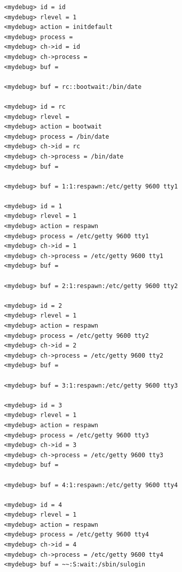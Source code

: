{\begin{shaded}
\begin{verbatim}
<mydebug> id = id
<mydebug> rlevel = 1
<mydebug> action = initdefault
<mydebug> process = 
<mydebug> ch->id = id
<mydebug> ch->process = 
<mydebug> buf = 

<mydebug> buf = rc::bootwait:/bin/date

<mydebug> id = rc
<mydebug> rlevel = 
<mydebug> action = bootwait
<mydebug> process = /bin/date
<mydebug> ch->id = rc
<mydebug> ch->process = /bin/date
<mydebug> buf = 

<mydebug> buf = 1:1:respawn:/etc/getty 9600 tty1

<mydebug> id = 1
<mydebug> rlevel = 1
<mydebug> action = respawn
<mydebug> process = /etc/getty 9600 tty1
<mydebug> ch->id = 1
<mydebug> ch->process = /etc/getty 9600 tty1
<mydebug> buf = 

<mydebug> buf = 2:1:respawn:/etc/getty 9600 tty2

<mydebug> id = 2
<mydebug> rlevel = 1
<mydebug> action = respawn
<mydebug> process = /etc/getty 9600 tty2
<mydebug> ch->id = 2
<mydebug> ch->process = /etc/getty 9600 tty2
<mydebug> buf = 

<mydebug> buf = 3:1:respawn:/etc/getty 9600 tty3

<mydebug> id = 3
<mydebug> rlevel = 1
<mydebug> action = respawn
<mydebug> process = /etc/getty 9600 tty3
<mydebug> ch->id = 3
<mydebug> ch->process = /etc/getty 9600 tty3
<mydebug> buf = 

<mydebug> buf = 4:1:respawn:/etc/getty 9600 tty4

<mydebug> id = 4
<mydebug> rlevel = 1
<mydebug> action = respawn
<mydebug> process = /etc/getty 9600 tty4
<mydebug> ch->id = 4
<mydebug> ch->process = /etc/getty 9600 tty4
<mydebug> buf = ~~:S:wait:/sbin/sulogin
\end{verbatim}\end{shaded}}

